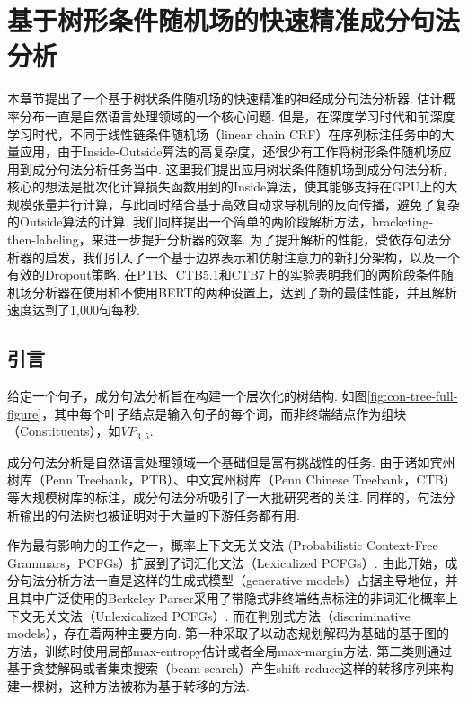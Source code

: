 \chapter{基于树形条件随机场的快速精准成分句法分析}
\label{cha:con-crf}

本章节提出了一个基于树状条件随机场的快速精准的神经成分句法分析器.
估计概率分布一直是自然语言处理领域的一个核心问题.
但是，在深度学习时代和前深度学习时代，不同于线性链条件随机场（linear chain CRF）在序列标注任务中的大量应用，由于Inside-Outside算法的高复杂度，还很少有工作将树形条件随机场应用到成分句法分析任务当中.
这里我们提出应用树状条件随机场到成分句法分析，核心的想法是批次化计算损失函数用到的Inside算法，使其能够支持在GPU上的大规模张量并行计算，与此同时结合基于高效自动求导机制的反向传播，避免了复杂的Outside算法的计算.
我们同样提出一个简单的两阶段解析方法，bracketing-then-labeling，来进一步提升分析器的效率.
为了提升解析的性能，受依存句法分析器的启发，我们引入了一个基于边界表示和仿射注意力的新打分架构，以及一个有效的Dropout策略.
在PTB、CTB5.1和CTB7上的实验表明我们的两阶段条件随机场分析器在使用和不使用BERT的两种设置上，达到了新的最佳性能，并且解析速度达到了1,000句每秒.

\section{引言}\label{sec:con-intro}


给定一个句子，成分句法分析旨在构建一个层次化的树结构. 如图\ref{fig:con-tree-full-figure}，其中每个叶子结点是输入句子的每个词，而非终端结点作为组块（Constituents），如\texttt{$VP_{3,5}$}.

成分句法分析是自然语言处理领域一个基础但是富有挑战性的任务.
由于诸如宾州树库（Penn Treebank，PTB）、中文宾州树库（Penn Chinese Treebank，CTB）等大规模树库的标注，成分句法分析吸引了一大批研究者的关注.
同样的，句法分析输出的句法树也被证明对于大量的下游任务\cite{akoury-etal-2019-syntactically,wang-etal-2018-tree}都有用.

作为最有影响力的工作之一，\cite{collins-1997-three}概率上下文无关文法 (Probabilistic Context-Free Grammars，PCFGs）扩展到了词汇化文法（Lexicalized PCFGs）.
由此开始，成分句法分析方法一直是这样的生成式模型（generative models）占据主导地位，并且其中广泛使用的Berkeley Parser采用了带隐式非终端结点标注的非词汇化概率上下文无关文法（Unlexicalized PCFGs）\cite{matsuzaki-etal-2005-probabilistic,petrov-klein-2007-improved}.
而在判别式方法（discriminative models），存在着两种主要方向.
第一种采取了以动态规划解码为基础的基于图的方法，训练时使用局部max-entropy估计\cite{kaplan-etal-2004-speed}或者全局max-margin方法\cite{taskar-etal-2004-max}.
第二类则通过基于贪婪解码或者集束搜索（beam search）产生shift-reduce这样的转移序列来构建一棵树，这种方法被称为基于转移的方法\cite{sagae-lavie-2005-classifier,zhu-etal-2013-fast}.

